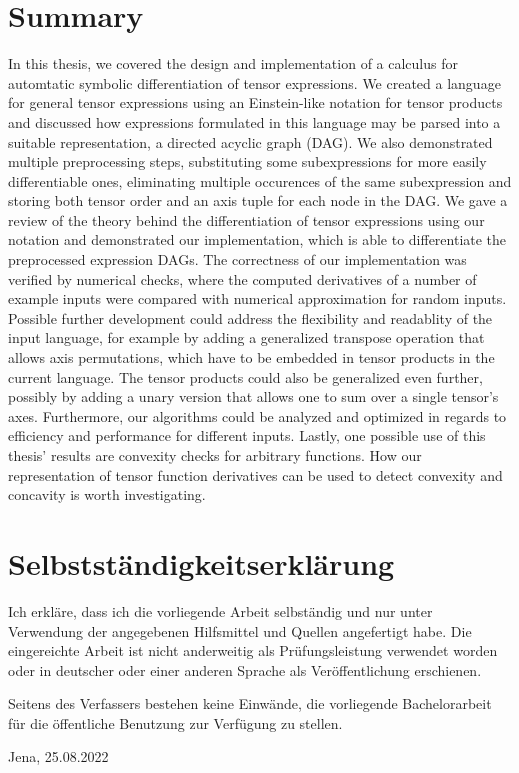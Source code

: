 \documentclass[12pt, a4paper]{report}
\begin{document}
\chapter{Summary}
In this thesis, we covered the design and implementation of a calculus for automtatic symbolic differentiation of tensor expressions.
We created a language for general tensor expressions using an Einstein-like notation for tensor products and discussed how expressions formulated in this language may be parsed into a suitable representation, a directed acyclic graph (DAG).
We also demonstrated multiple preprocessing steps, substituting some subexpressions for more easily differentiable ones, eliminating multiple occurences of the same subexpression and storing both tensor order and an axis tuple for each node in the DAG.
We gave a review of the theory behind the differentiation of tensor expressions using our notation and demonstrated our implementation, which is able to differentiate the preprocessed expression DAGs.
The correctness of our implementation was verified by numerical checks, where the computed derivatives of a number of example inputs were compared with numerical approximation for random inputs. %
Possible further development could address the flexibility and readablity of the input language, for example by adding a generalized transpose operation that allows axis permutations, which have to be embedded in tensor products in the current language.
The tensor products could also be generalized even further, possibly by adding a unary version that allows one to sum over a single tensor's axes.
Furthermore, our algorithms could be analyzed and optimized in regards to efficiency and performance for different inputs.
Lastly, one possible use of this thesis' results are convexity checks for arbitrary functions.
How our representation of tensor function derivatives can be used to detect convexity and concavity is worth investigating.

\printbibliography
{}

\chapter*{Selbstständigkeitserklärung}
Ich erkläre, dass ich die vorliegende Arbeit selbständig und nur unter Verwendung der angegebenen Hilfsmittel und Quellen angefertigt habe.
Die eingereichte Arbeit ist nicht anderweitig als Prüfungsleistung verwendet worden oder in deutscher oder einer anderen Sprache als Veröffentlichung erschienen.

\setlength{\parindent}{0pt}
\vspace{10pt}
Seitens des Verfassers bestehen keine Einwände, die vorliegende Bachelorarbeit für die öffentliche Benutzung zur Verfügung zu stellen. \vspace{50pt}

Jena, 25.08.2022
\end{document}

